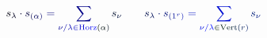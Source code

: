 \documentclass[12pt]{article}
\begin{document}
\makeatletter
\renewcommand*{\@textcolor}[3]{%
  \protect\leavevmode
  \begingroup
    \color#1{#2}#3%
  \endgroup
}
\makeatother
\begin{displaymath}
\mathcolor[RGB]{0,0,15}{s} _ { \mathcolor[RGB]{0,0,30}{\lambda} } \mathcolor[RGB]{0,0,45}{\cdot} \mathcolor[RGB]{0,0,60}{s} _ { \mathcolor[RGB]{0,0,75}{(} \mathcolor[RGB]{0,0,90}{\alpha} \mathcolor[RGB]{0,0,105}{)} } \mathcolor[RGB]{0,0,120}{=} \mathcolor[RGB]{0,0,135}{\sum} _ { \mathcolor[RGB]{0,0,150}{\nu} \mathcolor[RGB]{0,0,165}{/} \mathcolor[RGB]{0,0,180}{\lambda} \mathcolor[RGB]{0,0,195}{\in} \mathrm { \mathcolor[RGB]{0,0,210}{H} \mathcolor[RGB]{0,0,225}{o} \mathcolor[RGB]{0,0,240}{r} \mathcolor[RGB]{0,0,255}{z} } \mathcolor[RGB]{0,15,0}{(} \mathcolor[RGB]{0,15,15}{\alpha} \mathcolor[RGB]{0,15,30}{)} } \mathcolor[RGB]{0,15,45}{s} _ { \mathcolor[RGB]{0,15,60}{\nu} } \qquad \mathcolor[RGB]{0,15,75}{s} _ { \mathcolor[RGB]{0,15,90}{\lambda} } \mathcolor[RGB]{0,15,105}{\cdot} \mathcolor[RGB]{0,15,120}{s} _ { \mathcolor[RGB]{0,15,135}{(} \mathcolor[RGB]{0,15,150}{1} ^ { \mathcolor[RGB]{0,15,165}{r} } \mathcolor[RGB]{0,15,180}{)} } \mathcolor[RGB]{0,15,195}{=} \mathcolor[RGB]{0,15,210}{\sum} _ { \mathcolor[RGB]{0,15,225}{\nu} \mathcolor[RGB]{0,15,240}{/} \mathcolor[RGB]{0,15,255}{\lambda} \mathcolor[RGB]{0,30,0}{\in} \mathrm { \mathcolor[RGB]{0,30,15}{V} \mathcolor[RGB]{0,30,30}{e} \mathcolor[RGB]{0,30,45}{r} \mathcolor[RGB]{0,30,60}{t} } \mathcolor[RGB]{0,30,75}{(} \mathcolor[RGB]{0,30,90}{r} \mathcolor[RGB]{0,30,105}{)} } \mathcolor[RGB]{0,30,120}{s} _ { \mathcolor[RGB]{0,30,135}{\nu} }
\end{displaymath}
\end{document}
